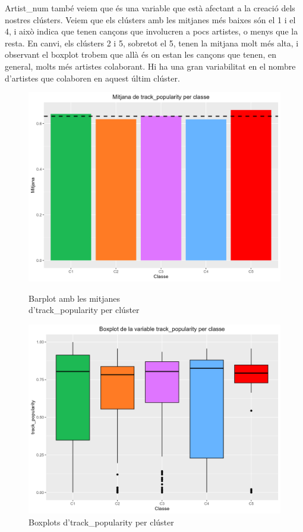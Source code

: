 \documentclass{article}
\begin{document}
Artist\_num també veiem que és una variable que està afectant a la creació dels nostres clústers. Veiem que els clústers amb les mitjanes més baixes són el 1 i el 4, i això indica que tenen cançons que involucren a pocs artistes, o menys que la resta. En canvi, els clústers 2 i 5, sobretot el 5, tenen la mitjana molt més alta, i observant el boxplot trobem que allà és on estan les cançons que tenen, en general, molts més artistes colaborant. Hi ha una gran variabilitat en el nombre d'artistes que colaboren en aquest últim clúster. 

\begin{figure}[H]
\centering
    \begin{minipage}{.49\textwidth}
        \centering
        \includegraphics[width=0.95\linewidth]{Images/5_Profiling/numeriques/Num_BarPlot_track_popularity.png}
        \caption{Barplot amb les mitjanes \\ d'track\_popularity per clúster}
        \label{fig:Num_BarPlot_track_popularity}
    \end{minipage}%
    \begin{minipage}{.49\textwidth}
        \centering
        \includegraphics[width=0.95\linewidth]{Images/5_Profiling/numeriques/Num_BoxPlot_track_popularity.png}
        \caption{Boxplots d'track\_popularity per clúster}
        \label{fig:Num_BoxPlot_track_popularity}
    \end{minipage}%
\end{figure}
\end{document}
